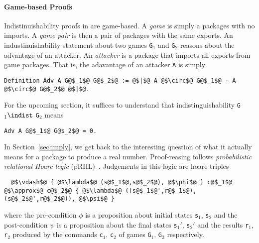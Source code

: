 %
\paragraph{Game-based Proofs}
%
Indistinuishability proofs in \ssprove are game-based.
%
A \emph{game} is simply a packages with no imports.
%
A \emph{game pair} is then a pair of packages with the same
exports.
%
An industinuishability statement about two games
\texttt{G}$_1$ and \texttt{G}$_2$
reasons about the advantage of an attacker.
%
An \emph{attacker} is a package that imports all
exports from game packages.
%
That is, the adavantage of an attacker \texttt{A}
is simply
%
\begin{verbatim}
Definition Adv A G@$_1$@ G@$_2$@ := @$|$@ A @$\circ$@ G@$_1$@ - A @$\circ$@ G@$_2$@ @$|$@.
\end{verbatim}
%
%
For the upcoming section, it suffices to understand that
indistinguishability \texttt{G}$_1 \indist$ \texttt{G}$_2$ means
%
\begin{verbatim}
Adv A G@$_1$@ G@$_2$@ = 0.
\end{verbatim}
%
In Section~\ref{sec:imply}, we get back to the interesting
question of what it actually means for a package to produce
a real number.
%
Proof-reasing follows \textit{probabilistic relational Hoare logic} (pRHL)~\cite{barthe2009formal}.
%
Judgements in this logic are hoare triples
%
%
\begin{verbatim}
  @$\vdash$@ { @$\lambda$@ (s@$_1$@,s@$_2$@), @$\phi$@ } c@$_1$@ @$\approx$@ c@$_2$@ { @$\lambda$@ ((s@$_1$@',r@$_1$@),(s@$_2$@',r@$_2$@)), @$\psi$@ }
\end{verbatim}
%
where the pre-condition $\phi$ is a proposition about initial states
\texttt{s}$_1$, \texttt{s}$_2$
and the post-condition $\psi$ is a proposition about the final states
\texttt{s}$_1'$, \texttt{s}$_2'$
and the results
\texttt{r}$_1$, \texttt{r}$_2$
produced by the commands
\texttt{c}$_1$, \texttt{c}$_2$
of games
\texttt{G}$_1$, \texttt{G}$_2$
respectively.
%

